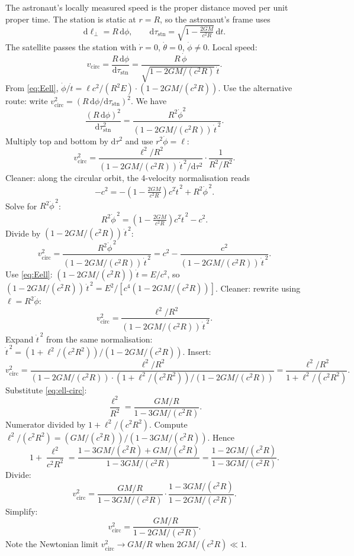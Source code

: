 \documentclass[11pt]{article}
\newcommand{\de}{\mathrm{d}}
\begin{document}
The astronaut's locally measured speed is the proper distance moved per unit proper time. The station is static at $r=R$, so the astronaut's frame uses
\[
\de\ell_\perp = R\,\de\phi,\qquad \de\tau_\text{stn} = \sqrt{1-\tfrac{2GM}{c^2 R}}\,\de t.
\]
The satellite passes the station with $\dot r=0$, $\dot\theta=0$, $\dot\phi\ne 0$. Local speed:
\[
v_\text{circ} = \frac{R\,\de\phi}{\de\tau_\text{stn}} = \frac{R\,\dot\phi}{\sqrt{1-2GM/(c^2 R)}\,\dot t}.
\]
From \eqref{eq:Eell}, $\dot\phi/\dot t = \ell c^2/(R^2 E)\cdot(1-2GM/(c^2 R))$. Use the alternative route: write $v_\text{circ}^2 = (R\,\de\phi/\de\tau_\text{stn})^2$. We have
\[
\frac{(R\,\de\phi)^2}{\de\tau_\text{stn}^2} = \frac{R^2 \dot\phi^2}{(1-2GM/(c^2 R))\,\dot t^{\,2}}.
\]
Multiply top and bottom by $\de\tau^2$ and use $r^2\dot\phi = \ell$:
\[
v_\text{circ}^2 = \frac{\ell^2/R^2}{(1-2GM/(c^2 R))\,\dot t^{\,2}/\de\tau^2}\cdot\frac{1}{R^2/R^2}.
\]
Cleaner: along the circular orbit, the 4-velocity normalisation reads
\[
-c^2 = -\!\left(1-\tfrac{2GM}{c^2 R}\right)\!c^2\dot t^{\,2} + R^2\dot\phi^{\,2}.
\]
Solve for $R^2\dot\phi^{\,2}$:
\[
R^2\dot\phi^{\,2} = \!\left(1-\tfrac{2GM}{c^2 R}\right)\!c^2\dot t^{\,2} - c^2.
\]
Divide by $(1-2GM/(c^2 R))\,\dot t^{\,2}$:
\[
v_\text{circ}^2 = \frac{R^2\dot\phi^{\,2}}{(1-2GM/(c^2 R))\,\dot t^{\,2}} = c^2 - \frac{c^2}{(1-2GM/(c^2 R))\,\dot t^{\,2}}.
\]
Use \eqref{eq:Eell}: $(1-2GM/(c^2 R))\,\dot t = E/c^2$, so $(1-2GM/(c^2 R))\,\dot t^{\,2} = E^2/[c^4(1-2GM/(c^2 R))]$. Cleaner: rewrite using $\ell = R^2\dot\phi$:
\[
v_\text{circ}^2 = \frac{\ell^2/R^2}{(1-2GM/(c^2 R))\,\dot t^{\,2}}.
\]
Expand $\dot t^{\,2}$ from the same normalisation: $\dot t^{\,2} = (1+\ell^2/(c^2 R^2))/(1-2GM/(c^2 R))$. Insert:
\[
v_\text{circ}^2 = \frac{\ell^2/R^2}{(1-2GM/(c^2 R))\cdot(1+\ell^2/(c^2 R^2))/(1-2GM/(c^2 R))} = \frac{\ell^2/R^2}{1 + \ell^2/(c^2 R^2)}.
\]
Substitute \eqref{eq:ell-circ}:
\[
\frac{\ell^2}{R^2} = \frac{GM/R}{1 - 3GM/(c^2 R)}.
\]
Numerator divided by $1+\ell^2/(c^2 R^2)$. Compute $\ell^2/(c^2 R^2) = (GM/(c^2 R))/(1-3GM/(c^2 R))$. Hence
\[
1 + \frac{\ell^2}{c^2 R^2} = \frac{1 - 3GM/(c^2 R) + GM/(c^2 R)}{1-3GM/(c^2 R)} = \frac{1 - 2GM/(c^2 R)}{1 - 3GM/(c^2 R)}.
\]
Divide:
\[
v_\text{circ}^2 = \frac{GM/R}{1-3GM/(c^2 R)}\cdot\frac{1-3GM/(c^2 R)}{1-2GM/(c^2 R)}.
\]
Simplify:
\begin{equation}
\boxed{\;v_\text{circ}^2 = \frac{GM/R}{1 - 2GM/(c^2 R)}.\;}
\label{eq:vcirc}
\end{equation}
Note the Newtonian limit $v_\text{circ}^2\to GM/R$ when $2GM/(c^2 R)\ll 1$.
\end{document}
